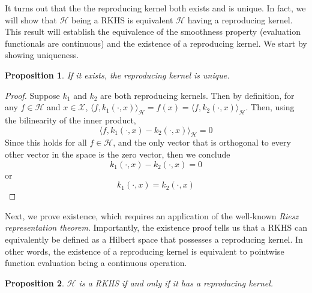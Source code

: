 \documentclass[12pt]{article}
\newtheorem{prop}{Proposition}
\begin{document}
It turns out that the the reproducing kernel both exists and is unique. In fact, we will show that $\mathcal{H}$ being a RKHS is equivalent $\mathcal{H}$ having a reproducing kernel. This result will establish 
the equivalence of the smoothness property (evaluation functionals are continuous) and the existence of a reproducing kernel. We start by showing uniqueness. 
\begin{prop}
If it exists, the reproducing kernel is unique. 
\end{prop}
\begin{proof} 
Suppose $k_1$ and $k_2$ are both reproducing kernels. Then by definition, for any $f \in \mathcal{H}$ and $x \in \mathcal{X}$, 
$\langle f, k_1(\cdot, x)\rangle_{\mathcal{H}} = f(x) = \langle f, k_2(\cdot, x)\rangle_{\mathcal{H}}$. Then, using the bilinearity of the 
inner product,
\[\langle f, k_1(\cdot, x) - k_2(\cdot, x) \rangle_{\mathcal{H}} = 0\]
Since this holds for all $f \in \mathcal{H}$, and the only vector that is orthogonal to every other vector in the space is the zero vector, then we conclude
\[k_1(\cdot, x) - k_2(\cdot, x) = 0\]
or 
\[k_1(\cdot, x) = k_2(\cdot, x)\]

\end{proof}
 Next, we prove existence, which requires an application of the well-known \textit{Riesz representation theorem}. Importantly, the existence proof tells us that a RKHS can equivalently be defined as
 a Hilbert space that possesses a reproducing kernel. In other words, the existence of a reproducing kernel is equivalent to pointwise function evaluation being a continuous operation. 
 \begin{prop}
 $\mathcal{H}$ is a RKHS if and only if it has a reproducing kernel. 
 \end{prop}
\end{document}
